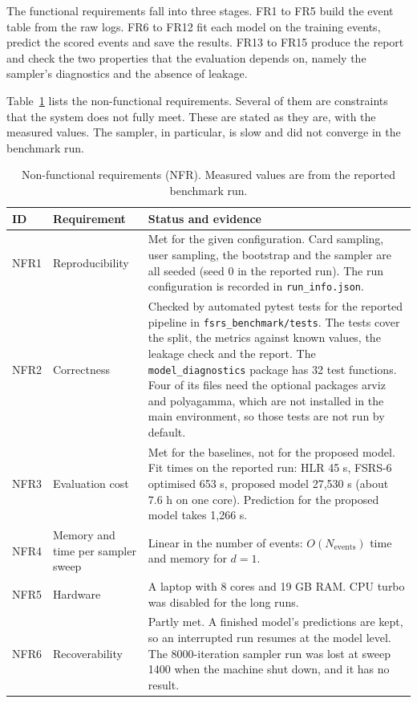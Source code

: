 The functional requirements fall into three stages. FR1 to FR5 build the event table from the raw logs. FR6 to FR12
fit each model on the training events, predict the scored events and save the results. FR13 to FR15 produce the
report and check the two properties that the evaluation depends on, namely the sampler's diagnostics and the absence
of leakage.

Table~\ref{tab:nonfunctional} lists the non-functional requirements. Several of them are constraints that the
system does not fully meet. These are stated as they are, with the measured values. The sampler, in particular,
is slow and did not converge in the benchmark run.

\begin{table}[!htbp]
  \centering
  \footnotesize\setlength{\tabcolsep}{4pt}
  \caption{Non-functional requirements (NFR). Measured values are from the reported benchmark run.}
  \label{tab:nonfunctional}
  \footnotesize
  \begin{tabular}{@{}p{1.2cm}p{4.1cm}p{8.9cm}@{}}
    \toprule
    ID & Requirement & Status and evidence \\
    \midrule
    NFR1 & Reproducibility & Met for the given configuration. Card sampling, user sampling, the bootstrap and the sampler are all seeded (seed 0 in the reported run). The run configuration is recorded in \texttt{run\_\allowbreak info.json}. \\
    NFR2 & Correctness & Checked by \NumBenchTests{} automated pytest tests for the reported pipeline in \texttt{fsrs\_benchmark/\allowbreak tests}. The tests cover the split, the metrics against known values, the leakage check and the report. The \texttt{model\_diagnostics} package has 32 test functions. Four of its files need the optional packages arviz and polyagamma, which are not installed in the main environment, so those tests are not run by default. \\
    NFR3 & Evaluation cost & Met for the baselines, not for the proposed model. Fit times on the reported run: HLR 45 s, FSRS-6 optimised 653 s, proposed model 27,530 s (about 7.6 h on one core). Prediction for the proposed model takes 1,266 s. \\
    NFR4 & Memory and time per sampler sweep & Linear in the number of events: $O(N_{\text{events}})$ time and memory for $d = 1$. \\
    NFR5 & Hardware & A laptop with 8 cores and 19 GB RAM. CPU turbo was disabled for the long runs. \\
    NFR6 & Recoverability & Partly met. A finished model's predictions are kept, so an interrupted run resumes at the model level. The 8000-iteration sampler run was lost at sweep 1400 when the machine shut down, and it has no result. \\

\end{tabular}
\end{table}
